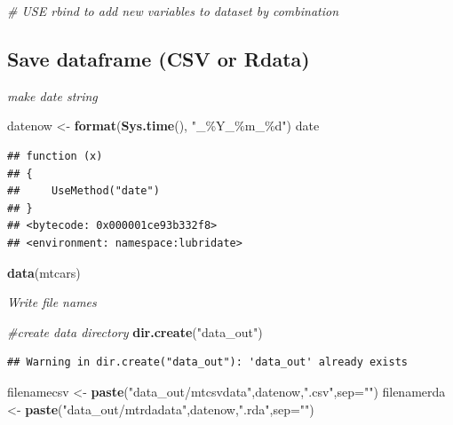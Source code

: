 \documentclass[
]{article}
\newenvironment{Shaded}{\begin{snugshade}}{\end{snugshade}}
\newcommand{\AttributeTok}[1]{\textcolor[rgb]{0.13,0.29,0.53}{#1}}
\newcommand{\CommentTok}[1]{\textcolor[rgb]{0.56,0.35,0.01}{\textit{#1}}}
\newcommand{\FunctionTok}[1]{\textcolor[rgb]{0.13,0.29,0.53}{\textbf{#1}}}
\newcommand{\NormalTok}[1]{#1}
\newcommand{\OtherTok}[1]{\textcolor[rgb]{0.56,0.35,0.01}{#1}}
\newcommand{\StringTok}[1]{\textcolor[rgb]{0.31,0.60,0.02}{#1}}
\begin{document}
\begin{Shaded}
\begin{Highlighting}[]
\CommentTok{\# USE rbind to add new variables to dataset by combination}
\end{Highlighting}
\end{Shaded}

\hypertarget{save-dataframe-csv-or-rdata}{%
\subsection{Save dataframe (CSV or Rdata)}\label{save-dataframe-csv-or-rdata}}

\emph{make date string}

\begin{Shaded}
\begin{Highlighting}[]
\NormalTok{datenow }\OtherTok{\textless{}{-}} \FunctionTok{format}\NormalTok{(}\FunctionTok{Sys.time}\NormalTok{(), }\StringTok{"\_\%Y\_\%m\_\%d"}\NormalTok{)}
\NormalTok{date}
\end{Highlighting}
\end{Shaded}

\begin{verbatim}
## function (x) 
## {
##     UseMethod("date")
## }
## <bytecode: 0x000001ce93b332f8>
## <environment: namespace:lubridate>
\end{verbatim}

\begin{Shaded}
\begin{Highlighting}[]
\FunctionTok{data}\NormalTok{(mtcars)}
\end{Highlighting}
\end{Shaded}

\emph{Write file names}

\begin{Shaded}
\begin{Highlighting}[]
\CommentTok{\#create data directory}
\FunctionTok{dir.create}\NormalTok{(}\StringTok{"data\_out"}\NormalTok{)}
\end{Highlighting}
\end{Shaded}

\begin{verbatim}
## Warning in dir.create("data_out"): 'data_out' already exists
\end{verbatim}

\begin{Shaded}
\begin{Highlighting}[]
\NormalTok{filenamecsv }\OtherTok{\textless{}{-}} \FunctionTok{paste}\NormalTok{(}\StringTok{"data\_out/mtcsvdata"}\NormalTok{,datenow,}\StringTok{".csv"}\NormalTok{,}\AttributeTok{sep=}\StringTok{""}\NormalTok{)}
\NormalTok{filenamerda }\OtherTok{\textless{}{-}} \FunctionTok{paste}\NormalTok{(}\StringTok{"data\_out/mtrdadata"}\NormalTok{,datenow,}\StringTok{".rda"}\NormalTok{,}\AttributeTok{sep=}\StringTok{""}\NormalTok{)}
\end{Highlighting}
\end{Shaded}
\end{document}
